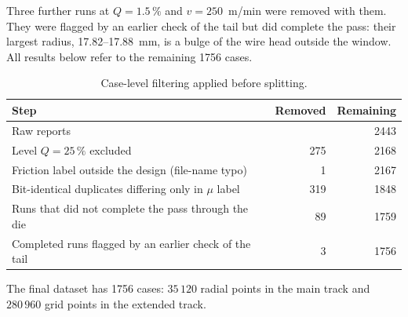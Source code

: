 Three further runs at $Q=1.5\,\%$ and $v=250$~m/min were removed with them. They were flagged by an earlier check of the tail but did complete the pass: their largest radius, 17.82--17.88~mm, is a bulge of the wire head outside the window. All results below refer to the remaining 1756 cases.

\begin{table}[htbp]
\centering\small
\caption{Case-level filtering applied before splitting.}
\label{tab:filtering}
\begin{tabular}{@{}lrr@{}}
\toprule
Step & Removed & Remaining \\
\midrule
Raw reports                                            &     & 2443 \\ %
Level $Q=25\,\%$ excluded                                & 275 & 2168 \\ %
Friction label outside the design (file-name typo)     & 1   & 2167 \\ %
Bit-identical duplicates differing only in $\mu$ label & 319 & 1848 \\ %
Runs that did not complete the pass through the die    & 89  & 1759 \\ %
Completed runs flagged by an earlier check of the tail & 3   & 1756 \\ %
\bottomrule
\end{tabular}
\end{table}

The final dataset has 1756 cases: $35\,120$ radial points in the main track and $280\,960$ grid points in the extended track. %

